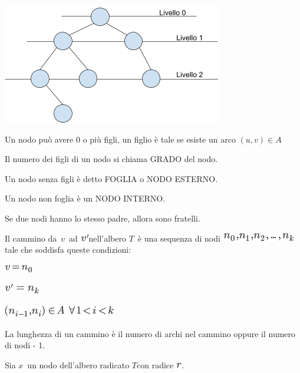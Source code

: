 \documentclass{article}
\begin{document}
{\includegraphics{images/image539.png}}


{Un nodo può avere 0 o più figli, un figlio è tale se esiste un arco $(u,v) \in A$}

{}

{Il numero dei figli di un nodo si chiama GRADO del nodo.}

{Un nodo senza figli è detto FOGLIA o NODO ESTERNO.}

{Un nodo non foglia è un NODO INTERNO.}

{Se due nodi hanno lo stesso padre, allora sono fratelli.}

{}

{Il cammino da}{~}$v${~ad
}\includegraphics{images/image77.png}{nell'albero
}$T${~è una sequenza di nodi
}\includegraphics{images/image78.png}{tale che soddisfa queste
condizioni:}

\includegraphics{images/image79.png}

\includegraphics{images/image80.png}

\includegraphics{images/image81.png}

{La lunghezza di un cammino è il numero di archi nel cammino oppure il
numero di nodi - 1.}

{Sia }$x${~un nodo dell'albero radicato
}$T${con radice
}\includegraphics{images/image83.png}{.}
\end{document}
